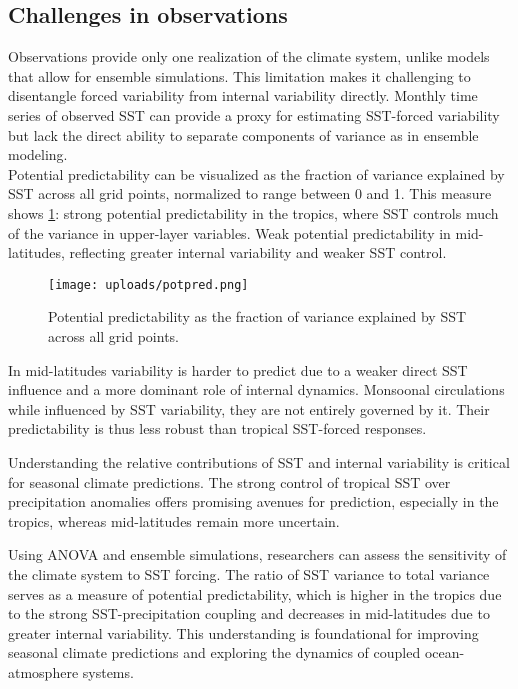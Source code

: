 \subsection{Challenges in observations}
Observations provide only one realization of the climate system, unlike models that allow for ensemble simulations. This limitation makes it challenging to disentangle forced variability from internal variability directly. Monthly time series of observed SST can provide a proxy for estimating SST-forced variability but lack the direct ability to separate components of variance as in ensemble modeling.\\




Potential predictability can be visualized as the fraction of variance explained by SST across all grid points, normalized to range between 0 and 1. This measure shows \ref{fig:potpred}: strong potential predictability in the tropics, where SST controls much of the variance in upper-layer variables.
Weak potential predictability in mid-latitudes, reflecting greater internal variability and weaker SST control.

\begin{figure}[htpb]
	\centering
	\texttt{[image: uploads/potpred.png]}
	\caption{Potential predictability as the fraction of variance explained by SST across all grid points.}
	\label{fig:potpred}
\end{figure}











In mid-latitudes variability is harder to predict due to a weaker direct SST influence and a more dominant role of internal dynamics. Monsoonal circulations while influenced by SST variability, they are not entirely governed by it. Their predictability is thus less robust than tropical SST-forced responses.

Understanding the relative contributions of SST and internal variability is critical for seasonal climate predictions.
The strong control of tropical SST over precipitation anomalies offers promising avenues for prediction, especially in the tropics, whereas mid-latitudes remain more uncertain.


Using ANOVA and ensemble simulations, researchers can assess the sensitivity of the climate system to SST forcing. The ratio of SST variance to total variance serves as a measure of potential predictability, which is higher in the tropics due to the strong SST-precipitation coupling and decreases in mid-latitudes due to greater internal variability. This understanding is foundational for improving seasonal climate predictions and exploring the dynamics of coupled ocean-atmosphere systems.
